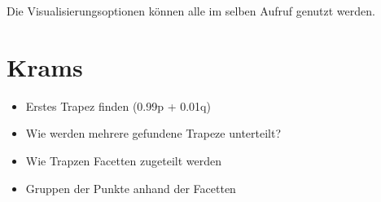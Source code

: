 \documentclass[11pt, a4paper]{article}
\begin{document}
Die Visualisierungsoptionen können alle im selben Aufruf genutzt werden.

\section{Krams}

\begin{itemize}
\item Erstes Trapez finden (0.99p + 0.01q)
\item Wie werden mehrere gefundene Trapeze unterteilt?
\item Wie Trapzen Facetten zugeteilt werden
\item Gruppen der Punkte anhand der Facetten
\end{itemize}
\end{document}
